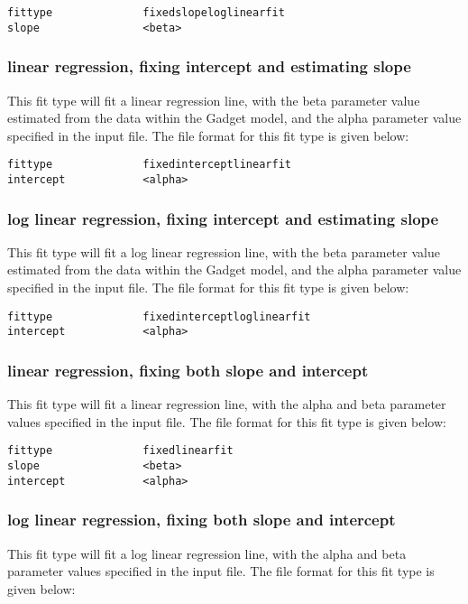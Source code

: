 \documentclass[10pt,twoside]{book}
\begin{document}
{\small\begin{verbatim}
fittype              fixedslopeloglinearfit
slope                <beta>
\end{verbatim}}

\subsubsection{linear regression, fixing intercept and estimating slope}
This fit type will fit a linear regression line, with the beta parameter value estimated from the data within the Gadget model, and the alpha parameter value specified in the input file.  The file format for this fit type is given below:

{\small\begin{verbatim}
fittype              fixedinterceptlinearfit
intercept            <alpha>
\end{verbatim}}

\subsubsection{log linear regression, fixing intercept and estimating slope}
This fit type will fit a log linear regression line, with the beta parameter value estimated from the data within the Gadget model, and the alpha parameter value specified in the input file.  The file format for this fit type is given below:

{\small\begin{verbatim}
fittype              fixedinterceptloglinearfit
intercept            <alpha>
\end{verbatim}}

\subsubsection{linear regression, fixing both slope and intercept}
This fit type will fit a linear regression line, with the alpha and beta parameter values specified in the input file.  The file format for this fit type is given below:

{\small\begin{verbatim}
fittype              fixedlinearfit
slope                <beta>
intercept            <alpha>
\end{verbatim}}

\subsubsection{log linear regression, fixing both slope and intercept}
This fit type will fit a log linear regression line, with the alpha and beta parameter values specified in the input file.  The file format for this fit type is given below:
\end{document}
